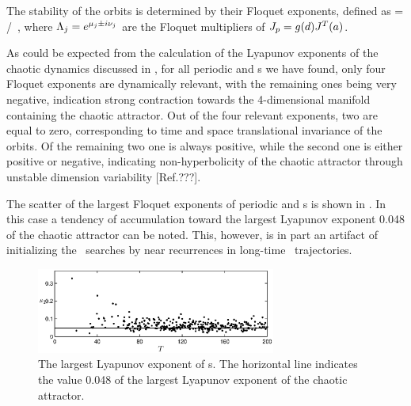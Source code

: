 The stability of the orbits is determined by their Floquet exponents,
defined as
\beq {} = \eigRe[j]/\period{} \,, 
\eeq
where $\ExpaEig_j = e^{\eigRe[j] \pm i \eigIm[j]}$ are the 
Floquet multipliers of $\jMps_p = g(\shift)J^T(a)$.  


As could be expected from the calculation of the Lyapunov 
exponents of the chaotic dynamics discussed in , 
for all periodic and \rpo s we have found, only four Floquet 
exponents are dynamically relevant, with the remaining ones being
very negative, indication strong contraction towards the 4-dimensional
manifold containing the chaotic attractor.  Out of the four 
relevant exponents, two are equal to zero, corresponding to 
time and space translational invariance of the orbits.  Of the
remaining two one is always positive, while the second one is either
positive or negative, indicating non-hyperbolicity of the
chaotic attractor through unstable dimension variability 
[Ref.???].

The scatter of the %
largest Floquet exponents 
of periodic and \rpo s is shown in . 
In this case a tendency of accumulation toward the largest 
Lyapunov exponent 0.048 of the chaotic attractor
can be noted.  This, however, is in part an artifact of initializing
the \rpo\ searches by near recurrences in 
long-time \statesp\ trajectories.

\begin{figure}[t]
\begin{center}
\includegraphics[width=0.7\textwidth]{figs/ks22_rpos_lyap.eps}
\end{center}
\caption{The largest Lyapunov exponent of \rpo s.  The horizontal
line indicates the value 0.048 of the largest Lyapunov exponent
of the chaotic attractor.
        } \label{f:ks22rposL}
\end{figure}

